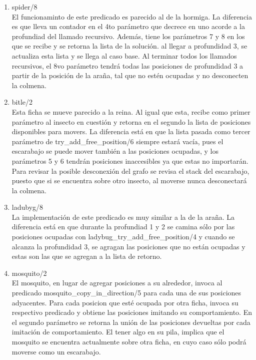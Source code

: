 \documentclass[a4paper,12pt]{article}
\begin{document}
\begin{enumerate}
\item spider/8\\
El funcionaminto de este predicado es parecido al de la hormiga. La diferencia es que lleva un contador en el 4to parámetro que decrece en uno acorde a la profundiad del llamado recursivo. Además, tiene los parámetros 7 y 8 en los que se recibe y se retorna la lista de la solución. al llegar a profundidad 3, se actualiza esta lista y se llega al caso base. Al terminar todos los llamados recursivos, el 8vo parámetro tendrá todas las posiciones de profundidad 3 a partir de la posición de la araña, tal que no estén ocupadas y no desconecten la colmena.

\item bitle/2\\
Esta ficha se mueve parecido a la reina. Al igual que esta, recibe como primer parámetro al insecto en cuestión y retorna en el segundo la lista de posiciones disponibles para movers. La diferencia está en que la lista pasada como tercer parámetro de try\_add\_free\_position/6 siempre estará vacía, pues el escarabajo se puede mover también a las posiciones ocupadas, y los parámetros 5 y 6 tendrán posiciones inaccesibles ya que estas no importarán. Para revisar la posible desconexión del grafo se revisa el stack del escarabajo, puesto que si se encuentra sobre otro insecto, al moverse nunca desconectará la colmena.

\item ladubyg/8\\
La implementación de este predicado es muy similar a la de la araña. La diferencia está en que durante la profundiad 1 y 2 se camina sólo por las posiciones ocupadas con ladybug\_try\_add\_free\_position/4 y cuando se alcanza la profundidad 3, se agragan las posiciones que no están ocupadas y estas son las que se agregan a la lista de retorno.

\item mosquito/2\\
El mosquito, en lugar de agregar posiciones a su alrededor, invoca al predicado mosquito\_copy\_in\_direction/5 para cada una de sus posiciones adyacentes. Para cada posicion que esté ocupada por otra ficha, invoca su respectivo predicado y obtiene las posiciones imitando su comportamiento. En el segundo parámetro se retorna la unión de las posiciones devueltas por cada imitación de comportamiento. El tener algo en su pila, implica que el mosquito se encuentra actualmente sobre otra ficha, en cuyo caso sólo podrá moverse como un escarabajo.


\end{enumerate}
\end{document}
